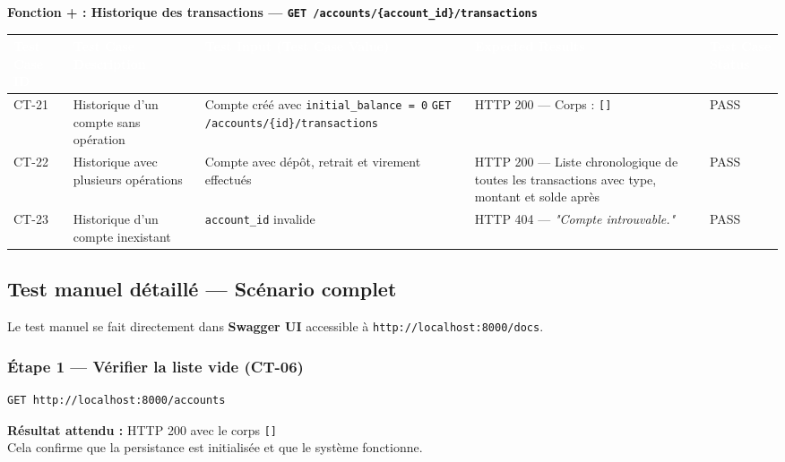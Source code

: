 \documentclass[12pt,a4paper]{article}
\begin{document}
\vspace{0.2cm}
{\bfseries\textcolor{danger}{Fonction + : Historique des transactions — \texttt{GET /accounts/\{account\_id\}/transactions}}}
\vspace{0.1cm}

\begin{longtable}{|L{1.6cm}|L{3.8cm}|L{5.2cm}|L{4.2cm}|L{1.8cm}|}
\hline
{}
\textbf{\textcolor{white}{Test Case ID}} & \textbf{\textcolor{white}{Test Case Description}} & \textbf{\textcolor{white}{Test Input (Test Case Value)}} & \textbf{\textcolor{white}{Expected Results}} & \textbf{\textcolor{white}{Test Case Status}} \\
\hline
CT-21 & Historique d'un compte sans opération & Compte créé avec \texttt{initial\_balance = 0} \newline \texttt{GET /accounts/\{id\}/transactions} & HTTP 200 — Corps : \texttt{[]} & PASS \\
\hline
{}
CT-22 & Historique avec plusieurs opérations & Compte avec dépôt, retrait et virement effectués & HTTP 200 — Liste chronologique de toutes les transactions avec type, montant et solde après & PASS \\
\hline
CT-23 & Historique d'un compte inexistant & \texttt{account\_id} invalide & HTTP 404 — \textit{"Compte introuvable."} & PASS \\
\hline
\end{longtable}

\subsection{Test manuel détaillé — Scénario complet}

Le test manuel se fait directement dans \textbf{Swagger UI} accessible à \texttt{http://localhost:8000/docs}.

\subsubsection{Étape 1 — Vérifier la liste vide (CT-06)}

\begin{lstlisting}[style=bash, caption={Appel GET /accounts}]
GET http://localhost:8000/accounts
\end{lstlisting}

\begin{successbox}
\textbf{Résultat attendu :} HTTP 200 avec le corps \texttt{[]}\\
Cela confirme que la persistance est initialisée et que le système fonctionne.
\end{successbox}
\end{document}
